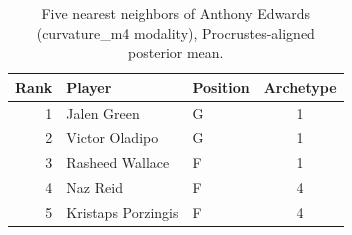 \begin{table}[htbp]
  \centering\small
  \begin{tabular}{rllc}
    \toprule
    Rank & Player & Position & Archetype \\
    \midrule
    1 & Jalen Green & G & 1 \\
    2 & Victor Oladipo & G & 1 \\
    3 & Rasheed Wallace & F & 1 \\
    4 & Naz Reid & F & 4 \\
    5 & Kristaps Porzingis & F & 4 \\
    \bottomrule
  \end{tabular}
  \caption{Five nearest neighbors of Anthony Edwards (curvature_m4 modality), Procrustes-aligned posterior mean.}
  \label{tab:Anthony_Edwards_neighbors_curvature_m4}
\end{table}

